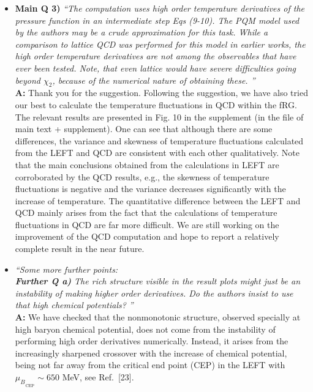 \documentclass[aps,article,author-year,notitlepage,showpacs]{revtex4-2}
\begin{document}
\begin{itemize}
In the revised version, we have added a new section (S.5) in the supplemental materials to discuss the relation between $T$ and $\langle p_{T} \rangle$.\\[1ex]


\item[$\bullet$]  {\bf Main Q 3)}  {\it ``The computation uses high order temperature derivatives of the
pressure function in an intermediate step Eqs (9-10). The PQM model
used by the authors may be a crude approximation for this task. While
a comparison to lattice QCD was performed for this model in earlier
works, the high order temperature derivatives are not among the
observables that have ever been tested. Note, that even lattice would
have severe difficulties going beyond $\chi_2$, because of the numerical
nature of obtaining these.
''}\\[-1ex]

{\bf A:} Thank you for the suggestion. Following the suggestion, we have also tried our best to calculate the temperature fluctuations in QCD within the fRG. The relevant results are presented in Fig. 10 in the supplement (in the file of main text + supplement). One can see that although there are some differences, the variance and skewness of temperature fluctuations calculated from the LEFT and QCD are consistent with each other qualitatively. Note that the main conclusions obtained from the calculations in LEFT are corroborated by the QCD results, e.g., the skewness of temperature fluctuations is negative and the variance decreases significantly with the increase of temperature. The quantitative difference between the LEFT and QCD mainly arises from the fact that the calculations of temperature fluctuations in QCD are far more difficult. We are still working on the improvement of the QCD computation and hope to report a relatively complete result in the near future. \\[1ex]


\item[$\bullet$] {\it ``Some more further points:\\[-2ex]

 {\bf Further Q a)} The rich structure visible in the result plots might just be an
instability of making higher order derivatives. Do the authors insist
to use that high chemical potentials?
''}\\[-1ex]

{\bf A:} We have checked that the nonmonotonic structure, observed specially at high baryon chemical potential, does not come from the instability of performing high order derivatives numerically. Instead, it arises from the increasingly sharpened crossover with the increase of chemical potential, being not far away from the critical end point (CEP) in the LEFT with ${\mu_B}_{_{\mathrm{CEP}}}\sim 650$ MeV, see Ref.~[23].\\[-2ex]


\end{itemize}
\end{document}
